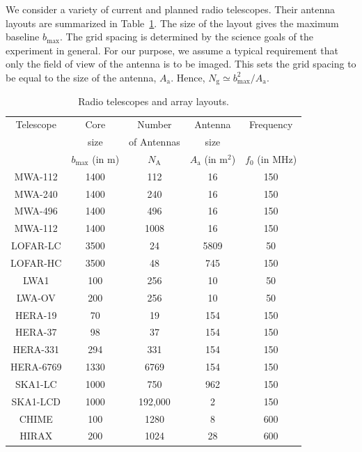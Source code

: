 \documentclass[a4paper,fleqn,usenatbib]{mnras}
\newcommand{\Nant}{N_\textrm{A}}
\newcommand{\Ngrid}{N_\textrm{g}}
\begin{document}
We consider a variety of current and planned radio telescopes. Their antenna 
layouts are summarized in Table~\ref{tab:antenna-layouts}. The size of the 
layout gives the maximum baseline $b_\textrm{max}$. The grid spacing is 
determined by the science goals of the experiment in general. For our 
purpose, we assume a typical requirement that only the field of view of the 
antenna is to be imaged. This sets the grid spacing to be equal to the size 
of the antenna, $A_\textrm{a}$. Hence, 
$\Ngrid\simeq b_\textrm{max}^2/A_\textrm{a}$. 

\begin{table}
  \scriptsize
  \centering
  \caption{Radio telescopes and array layouts.}
  \label{tab:antenna-layouts}
  \begin{threeparttable}
  \begin{tabular}{ccccc} 
    \hline
    Telescope & Core & Number & Antenna & Frequency \\
              & size & of Antennas & size & \\
              & $b_\textrm{max}$ (in m) & $\Nant$ & $A_\textrm{a}$ (in m$^2$) & $f_0$ (in MHz) \\
    \hline
    MWA-112\tnote{a} & 1400 & 112 & 16 & 150 \\
    MWA-240\tnote{a} & 1400 & 240 & 16 & 150 \\
    MWA-496\tnote{a} & 1400 & 496 & 16 & 150 \\
    MWA-112\tnote{a} & 1400 & 1008 & 16 & 150 \\
    LOFAR-LC\tnote{b} & 3500 & 24 & 5809 & 50 \\
    LOFAR-HC\tnote{b} & 3500 & 48 & 745 & 150 \\
    LWA1 & 100 & 256 & 10 & 50 \\
    LWA-OV\tnote{c} & 200 & 256 & 10 & 50 \\
    HERA-19 & 70 & 19 & 154 & 150 \\
    HERA-37 & 98 & 37 & 154 & 150 \\
    HERA-331 & 294 & 331 & 154 & 150 \\
    HERA-6769\tnote{d} & 1330 & 6769 & 154 & 150 \\
    SKA1-LC\tnote{e} & 1000 & 750 & 962 & 150 \\
    SKA1-LCD\tnote{f} & 1000 & 192,000 & 2 & 150 \\
    CHIME & 100 & 1280 & 8 & 600 \\
    HIRAX\tnote{g} & 200 & 1024 & 28 & 600 \\
    \hline
  \end{tabular}

\end{threeparttable}
\end{table}
\end{document}
